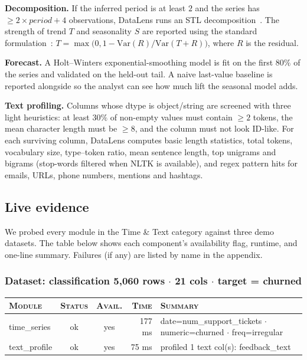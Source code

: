 \documentclass[11pt,a4paper]{article}
\begin{document}
\textbf{Decomposition.} If the inferred period is at least $2$ and the series has $\ge 2 \times \textit{period} + 4$ observations, DataLens runs an STL decomposition~\cite{cleveland1990stl}. The strength of trend $T$ and seasonality $S$ are reported using the standard formulation~\cite{hyndman2018fpp}: $T = \max\bigl(0, 1 - \mathrm{Var}(R)/\mathrm{Var}(T+R)\bigr)$, where $R$ is the residual.

\textbf{Forecast.} A Holt--Winters exponential-smoothing model is fit on the first $80\%$ of the series and validated on the held-out tail. A naive last-value baseline is reported alongside so the analyst can see how much lift the seasonal model adds.

\textbf{Text profiling.} Columns whose dtype is object/string are screened with three light heuristics: at least $30\%$ of non-empty values must contain $\ge 2$ tokens, the mean character length must be $\ge 8$, and the column must not look ID-like. For each surviving column, DataLens computes basic length statistics, total tokens, vocabulary size, type--token ratio, mean sentence length, top unigrams and bigrams (stop-words filtered when NLTK is available), and regex pattern hits for emails, URLs, phone numbers, mentions and hashtags.

\subsection{Live evidence}

We probed every module in the Time \& Text category against three
demo datasets. The table below shows each component's availability flag,
runtime, and one-line summary. Failures (if any) are listed by name in the
appendix.


\subsubsection*{Dataset: classification
\hfill {\color{ink3}\footnotesize 5,060 rows
{$\boldsymbol{\cdot}$} 21 cols
{$\boldsymbol{\cdot}$} target = churned}}

\begin{tabularx}{\linewidth}{l c c r X}
\toprule
\textsc{Module} & \textsc{Status} & \textsc{Avail.} & \textsc{Time} & \textsc{Summary} \\
\midrule
time\_series & \textcolor{ok}{ok} & \textcolor{ok}{yes} & 177 ms & date=num\_support\_tickets $\cdot$ numeric=churned $\cdot$ freq=irregular \\
text\_profile & \textcolor{ok}{ok} & \textcolor{ok}{yes} & 75 ms & profiled 1 text col(s): feedback\_text \\
\bottomrule
\end{tabularx}
\end{document}
